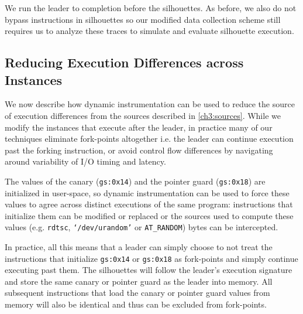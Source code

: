 We run the leader to completion before the silhouettes.
As before, we also do not bypass instructions in silhouettes
so our modified data collection scheme still requires us
to analyze these traces to simulate and evaluate
silhouette execution.

\subsection{Reducing Execution Differences across Instances}
We now describe how dynamic instrumentation can be used to reduce
the source of execution differences from the sources described in \ref{ch3:sources}.
While we modify
the instances that execute after the leader, 
in practice many of our techniques eliminate fork-points altogether 
i.e. the leader can continue execution past
the forking instruction,
or avoid control flow differences by navigating
around variability of I/O timing and latency. \newline


 \newline
The values of the canary (\texttt{gs:0x14}) and the pointer guard (\texttt{gs:0x18})
are initialized in user-space, so dynamic instrumentation can be used to force 
these values to agree across distinct executions of the same program:
instructions that initialize them can be
modified or replaced or the sources used to compute
these values (e.g. \texttt{rdtsc}, \texttt{`/dev/urandom'}
or \texttt{AT\_RANDOM}) bytes
can be intercepted.

In practice, all this means that a leader can simply choose to
not treat the instructions that initialize \texttt{gs:0x14} or
\texttt{gs:0x18} as fork-points and simply
continue executing past them. The silhouettes will follow the 
leader's execution signature and store the same canary or pointer guard
as the leader into memory. All subsequent instructions
that load the canary or pointer guard values 
from memory will also be identical and thus
can be excluded from fork-points. 
\newline

